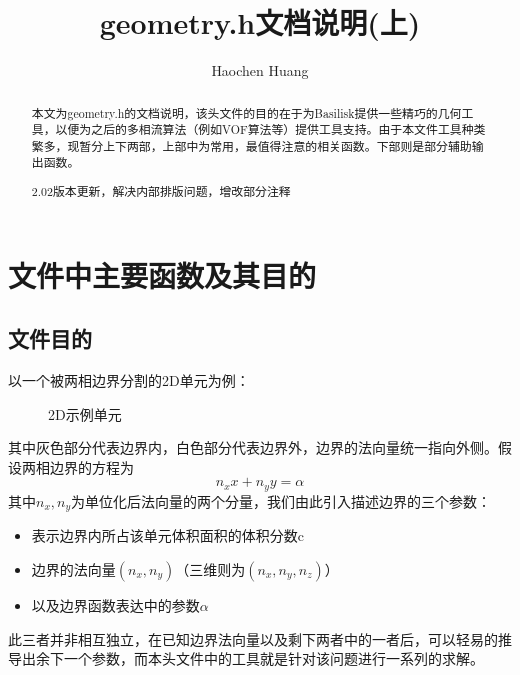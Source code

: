 \documentclass[lang=cn,11pt,a4paper]{elegantpaper}
\title{geometry.h文档说明(上)}
\author{Haochen Huang}
\date{\zhtoday}
\begin{document}
\maketitle
\tableofcontents

\begin{abstract}
本文为geometry.h的文档说明，该头文件的目的在于为Basilisk提供一些精巧的几何工具，以便为之后的多相流算法（例如VOF算法等）提供工具支持。由于本文件工具种类繁多，现暂分上下两部，上部中为常用，最值得注意的相关函数。下部则是部分辅助输出函数。\par
2.02版本更新，解决内部排版问题，增改部分注释
\end{abstract}

\section{文件中主要函数及其目的}
\subsection{文件目的}
以一个被两相边界分割的2D单元为例：\par
\begin{figure}[H]
\begin{center}
\end{center}
\caption{2D示例单元}
\end{figure}
其中灰色部分代表边界内，白色部分代表边界外，边界的法向量统一指向外侧。假设两相边界的方程为
\begin{equation}
    n_xx+n_yy=\alpha
\end{equation}
其中$n_x,n_y$为单位化后法向量的两个分量，我们由此引入描述边界的三个参数：
\begin{itemize}
    \item 表示边界内所占该单元体积面积的体积分数c
    \item 边界的法向量$(n_x,n_y)$（三维则为$(n_x,n_y,n_z)$）
    \item 以及边界函数表达中的参数$\alpha$
\end{itemize}
此三者并非相互独立，在已知边界法向量以及剩下两者中的一者后，可以轻易的推导出余下一个参数，而本头文件中的工具就是针对该问题进行一系列的求解。\par
\end{document}
